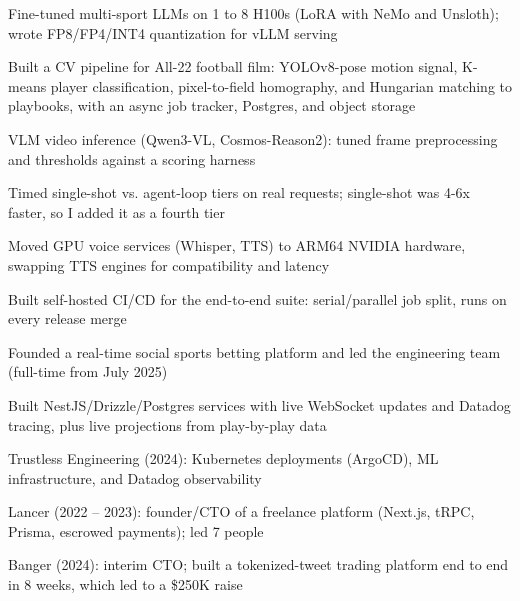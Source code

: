 \documentclass[print]{jack-resume}
\begin{document}
\begin{tightemize}
    \item Fine-tuned multi-sport LLMs on 1 to 8 H100s (LoRA with NeMo and Unsloth); wrote FP8/FP4/INT4 quantization for vLLM serving
    \item Built a CV pipeline for All-22 football film: YOLOv8-pose motion signal, K-means player classification, pixel-to-field homography, and Hungarian matching to playbooks, with an async job tracker, Postgres, and object storage
    \item VLM video inference (Qwen3-VL, Cosmos-Reason2): tuned frame preprocessing and thresholds against a scoring harness
    \item Timed single-shot vs. agent-loop tiers on real requests; single-shot was 4-6x faster, so I added it as a fourth tier
    \item Moved GPU voice services (Whisper, TTS) to ARM64 NVIDIA hardware, swapping TTS engines for compatibility and latency
    \item Built self-hosted CI/CD for the end-to-end suite: serial/parallel job split, runs on every release merge
\end{tightemize}
\sectionsep

\begin{tightemize}
    \item Founded a real-time social sports betting platform and led the engineering team (full-time from July 2025)
    \item Built NestJS/Drizzle/Postgres services with live WebSocket updates and Datadog tracing, plus live projections from play-by-play data
\end{tightemize}
\sectionsep

\begin{tightemize}
    \item Trustless Engineering (2024): Kubernetes deployments (ArgoCD), ML infrastructure, and Datadog observability
    \item Lancer (2022 -- 2023): founder/CTO of a freelance platform (Next.js, tRPC, Prisma, escrowed payments); led 7 people
    \item Banger (2024): interim CTO; built a tokenized-tweet trading platform end to end in 8 weeks, which led to a \$250K raise
\end{tightemize}
\sectionsep
\end{document}
